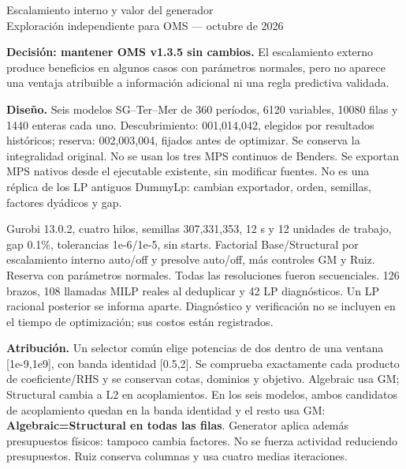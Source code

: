 \documentclass[11pt,a4paper]{article}
\begin{document}
\begin{center}{\Large Escalamiento interno y valor del generador}\\[4pt]
Exploración independiente para OMS --- octubre de 2026\end{center}
\textbf{Decisión: mantener OMS v1.3.5 sin cambios.} El escalamiento externo
produce beneficios en algunos casos con parámetros normales, pero no aparece
una ventaja atribuible a información adicional ni una regla predictiva validada.

\textbf{Diseño.} Seis modelos SG--Ter--Mer de 360 períodos, 6120 variables,
10080 filas y 1440 enteras cada uno. Descubrimiento: 001,014,042, elegidos por
resultados históricos; reserva: 002,003,004, fijados antes de optimizar. Se
conserva la integralidad original. No se usan los tres MPS continuos de Benders.
Se exportan MPS nativos desde el ejecutable existente, sin modificar fuentes.
No es una réplica de los LP antiguos DummyLp: cambian exportador, orden,
semillas, factores dyádicos y gap.

Gurobi 13.0.2, cuatro hilos, semillas 307,331,353, 12 s y 12 unidades de trabajo,
gap 0.1\%, tolerancias 1e-6/1e-5, sin starts. Factorial Base/Structural por
escalamiento interno auto/off y presolve auto/off, más controles GM y Ruiz.
Reserva con parámetros normales. Todas las resoluciones fueron secuenciales.
126 brazos, 108 llamadas MILP reales al deduplicar y 42 LP diagnósticos.
Un LP racional posterior se informa aparte. Diagnóstico y verificación no se
incluyen en el tiempo de optimización; sus costos están registrados.

\textbf{Atribución.} Un selector común elige potencias de dos dentro de una
ventana [1e-9,1e9], con banda identidad [0.5,2]. Se comprueba exactamente cada
producto de coeficiente/RHS y se conservan cotas, dominios y objetivo.
Algebraic usa GM; Structural cambia a L2 en acoplamientos. En los seis modelos,
ambos candidatos de acoplamiento quedan en la banda identidad y el resto usa
GM: \textbf{Algebraic=Structural en todas las filas}. Generator aplica además
presupuestos físicos: tampoco cambia factores. No se fuerza actividad reduciendo
presupuestos. Ruiz conserva columnas y usa cuatro medias iteraciones.
\end{document}
